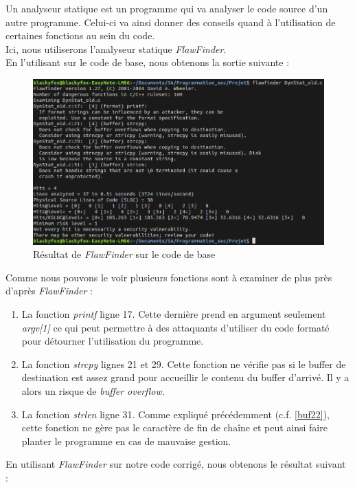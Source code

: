 Un analyseur statique est un programme qui va analyser le code source d'un autre programme. Celui-ci va ainsi donner des conseils quand à l'utilisation de certaines fonctions au sein du code.\\
Ici, nous utiliserons l'analyseur statique \textit{FlawFinder}.\\
En l'utilisant sur le code de base, nous obtenons la sortie suivante :
\begin{figure}[H]
  \centering
  \includegraphics[width=.9\textwidth]{img/conc1.png}
  \caption{Résultat de \textit{FlawFinder} sur le code de base}
  \label{img:conc1}
\end{figure}
Comme nous pouvons le voir plusieurs fonctions sont à examiner de plus près d'après \textit{FlawFinder} :
\begin{enumerate}
 \item La fonction \textit{printf} ligne 17. Cette dernière prend en argument seulement \textit{argv[1]} ce qui peut permettre à des attaquants d'utiliser du code formaté pour détourner l'utilisation du programme.
 \item La fonction \textit{strcpy} lignes 21 et 29. Cette fonction ne vérifie pas si le buffer de destination est assez grand pour accueillir le contenu du buffer d'arrivé. Il y a alors un risque de \textit{buffer overflow}.
 \item La fonction \textit{strlen} ligne 31. Comme expliqué précédemment (c.f. \ref{buf22}), cette fonction ne gère pas le caractère de fin de chaîne et peut ainsi faire planter le programme en cas de mauvaise gestion.
\end{enumerate}
En utilisant \textit{FlawFinder} sur notre code corrigé, nous obtenons le résultat suivant :
